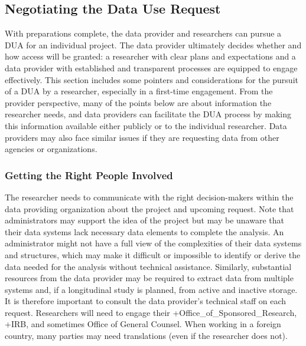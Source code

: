 \documentclass[
]{WileySix}
\begin{document}
\hypertarget{negotiating-the-data-use-request}{%
\subsection{Negotiating the Data Use Request}\label{negotiating-the-data-use-request}}

With preparations complete, the data provider and researchers can pursue a DUA for an individual project. The data provider ultimately decides whether and how access will be granted: a researcher with clear plans and expectations and a data provider with established and transparent processes are equipped to engage effectively. This section includes some pointers and considerations for the pursuit of a DUA by a researcher, especially in a first-time engagement. From the provider perspective, many of the points below are about information the researcher needs, and data providers can facilitate the DUA process by making this information available either publicly or to the individual researcher. Data providers may also face similar issues if they are requesting data from other agencies or organizations.

\hypertarget{getting-the-right-people-involved}{%
\subsubsection{Getting the Right People Involved}\label{getting-the-right-people-involved}}

The researcher needs to communicate with the right decision-makers within the data providing organization about the project and upcoming request. Note that administrators may support the idea of the project but may be unaware that their data systems lack necessary data elements to complete the analysis. An administrator might not have a full view of the complexities of their data systems and structures, which may make it difficult or impossible to identify or derive the data needed for the analysis without technical assistance. Similarly, substantial resources from the data provider may be required to extract data from multiple systems and, if a longitudinal study is planned, from active and inactive storage. It is therefore important to consult the data provider's technical staff on each request. Researchers will need to engage their +Office\_of\_Sponsored\_Research\textbar, +IRB\textbar, and sometimes Office of General Counsel. When working in a foreign country, many parties may need translations (even if the researcher does not).
\end{document}
